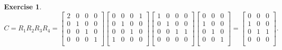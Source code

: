 \documentclass[paper=a4, fontsize=11pt]{scrartcl} %
\numberwithin{equation}{section} %
\numberwithin{figure}{section} %
\numberwithin{table}{section} %
\newtheorem{exercise}{Exercise}
\numberwithin{exercise}{section}
\begin{document}
\begin{exercise}
 $$C=R_1R_2R_3R_4=\begin{bmatrix}
2&  0 & 0 & 0 \\
0 & 1 & 0 & 0 \\
0 & 0 & 1 & 0 \\
0 & 0 & 0 & 1 \\
\end{bmatrix}\begin{bmatrix}
0& 0 & 0 & 1 \\
0 & 1 &  0& 0 \\
0 & 0 & 1& 0 \\
1 & 0 & 0 & 0\\
\end{bmatrix}\begin{bmatrix}
1& 0 & 0 & 0\\
0 & 1 &  0& 0 \\
0 & 0 & 1& 1 \\
0 & 0 & 0& 0\\
\end{bmatrix}\begin{bmatrix}
0 & 0 & 0\\
1 &  0& 0 \\
 0 & 1 & 0\\
 0 & 0& 1\\
\end{bmatrix}=\begin{bmatrix}
0 & 0 & 0\\
1 &  0& 0 \\
 0 & 1 & 1\\
 0 & 0& 0\\
\end{bmatrix}.$$
\end{exercise}
\end{document}

